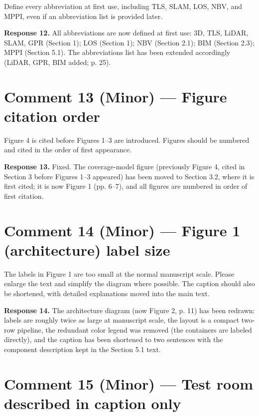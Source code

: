 \begin{quoting}
Define every abbreviation at first use, including TLS, SLAM, LOS, NBV, and MPPI, even if an abbreviation list is provided later.
\end{quoting}

\textbf{Response 12.} All abbreviations are now defined at first use: 3D, TLS, LiDAR, SLAM, GPR (Section 1); LOS (Section 1); NBV (Section 2.1); BIM (Section 2.3); MPPI (Section 5.1). The abbreviations list has been extended accordingly (LiDAR, GPR, BIM added; p. 25).

\section*{Comment 13 (Minor) — Figure citation order}

\begin{quoting}
Figure 4 is cited before Figures 1–3 are introduced. Figures should be numbered and cited in the order of first appearance.
\end{quoting}

\textbf{Response 13.} Fixed. The coverage-model figure (previously Figure 4, cited in Section 3 before Figures 1–3 appeared) has been moved to Section 3.2, where it is first cited; it is now Figure 1 (pp. 6–7), and all figures are numbered in order of first citation.

\section*{Comment 14 (Minor) — Figure 1 (architecture) label size}

\begin{quoting}
The labels in Figure 1 are too small at the normal manuscript scale. Please enlarge the text and simplify the diagram where possible. The caption should also be shortened, with detailed explanations moved into the main text.
\end{quoting}

\textbf{Response 14.} The architecture diagram (now Figure 2, p. 11) has been redrawn: labels are roughly twice as large at manuscript scale, the layout is a compact two-row pipeline, the redundant color legend was removed (the containers are labeled directly), and the caption has been shortened to two sentences with the component description kept in the Section 5.1 text.

\section*{Comment 15 (Minor) — Test room described in caption only}

